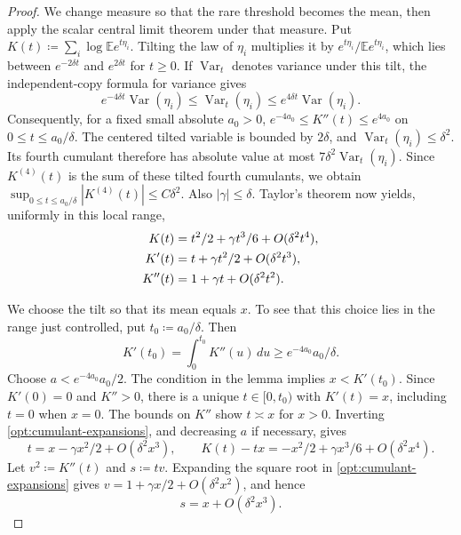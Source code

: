 \documentclass[11pt,letterpaper]{article}
\theoremstyle{remark}
\newcommand{\E}{\mathbb E}
\newcommand{\Var}{\operatorname{Var}}
\begin{document}
\begin{proof}
We change measure so that the rare threshold becomes the mean, then
apply the scalar central limit theorem under that measure. Put
\(K(t)\coloneqq\sum_i\log\E e^{t\eta_i}\). Tilting the law of
\(\eta_i\) multiplies it by \(e^{t\eta_i}/\E e^{t\eta_i}\), which
lies between \(e^{-2\delta t}\) and \(e^{2\delta t}\) for \(t\ge0\).
If \(\Var_t\) denotes variance
under this tilt, the independent-copy formula for variance gives
\[
 e^{-4\delta t}\Var(\eta_i)
 \le\Var_t(\eta_i)\le e^{4\delta t}\Var(\eta_i).
\]
Consequently, for a fixed small absolute \(a_0>0\),
\(e^{-4a_0}\le K''(t)\le e^{4a_0}\) on
\(0\le t\le a_0/\delta\). The centered tilted variable is bounded by
\(2\delta\), and \(\Var_t(\eta_i)\le\delta^2\). Its fourth cumulant
therefore has absolute value at most
\(7\delta^2\Var_t(\eta_i)\). Since \(K^{(4)}(t)\) is the sum of
these tilted fourth cumulants, we obtain
\(\sup_{0\le t\le a_0/\delta}|K^{(4)}(t)|\le C\delta^2\).
Also \(|\gamma|\le\delta\). Taylor's theorem now yields, uniformly in
this local range,
\begin{align}
 K(t)&=t^2/2+\gamma t^3/6+O(\delta^2t^4),\notag\\
 K'(t)&=t+\gamma t^2/2+O(\delta^2t^3),\notag\\
 K''(t)&=1+\gamma t+O(\delta^2t^2).
 \label{opt:cumulant-expansions}
\end{align}

We choose the tilt so that its mean equals \(x\). To see that this
choice lies in the range just controlled, put \(t_0\coloneqq a_0/\delta\).
Then
\[
 K'(t_0)=\int_0^{t_0}K''(u)\,du
 \ge e^{-4a_0}a_0/\delta.
\]
Choose \(a<e^{-4a_0}a_0/2\). The condition in the lemma implies
\(x<K'(t_0)\). Since \(K'(0)=0\) and \(K''>0\), there is a unique
\(t\in[0,t_0)\) with \(K'(t)=x\), including \(t=0\) when \(x=0\).
The bounds on \(K''\) show \(t\asymp x\) for \(x>0\).
Inverting \eqref{opt:cumulant-expansions}, and decreasing \(a\) if
necessary, gives
\begin{equation}
 t=x-\gamma x^2/2+O(\delta^2x^3),\qquad
 K(t)-tx=-x^2/2+\gamma x^3/6+O(\delta^2x^4).
 \label{opt:tilt-root}
\end{equation}
Let \(v^2\coloneqq K''(t)\) and \(s\coloneqq tv\). Expanding the square root in
\eqref{opt:cumulant-expansions} gives
\(v=1+\gamma x/2+O(\delta^2x^2)\), and hence
\begin{equation}
 s=x+O(\delta^2x^3).
 \label{opt:tilted-scale}
\end{equation}


\end{proof}
\end{document}
